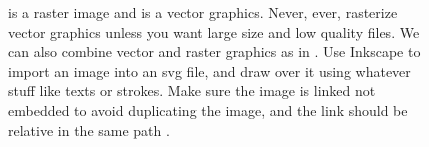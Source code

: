 \begin{figure}[htb]
  \centering
  
 {%
 is a raster image and  is a vector graphics.
Never, ever, rasterize vector graphics unless you want large size and low quality files.
We can also combine vector and raster graphics as in .
Use Inkscape to import  an image into an svg file, and draw over it using whatever stuff like texts or strokes.
Make sure the image is linked not embedded to avoid duplicating the image, and the link should be relative in the same path \cite{StackExchange:2011:HLI}.
 }
 \label{fig:example}
\end{figure}
